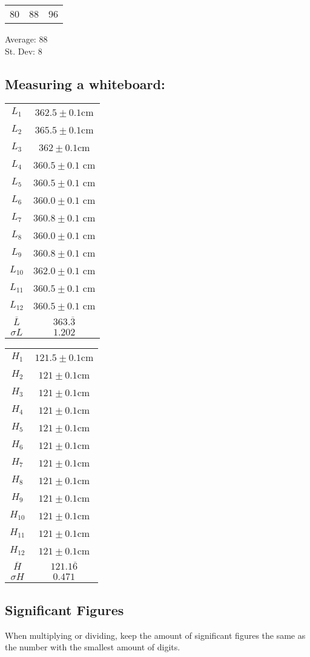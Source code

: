 \documentclass[]{article}
\begin{document}
\begin{tabular}{|c|c|c|}
    80&88&96
\end{tabular}
Average: 88\\ 
St. Dev: 8


\subsection*{Measuring a whiteboard:}
\begin{tabular}{|c|c|}
    \hline
    $L_1$&$362.5 \pm 0.1$cm\\
    $L_2$&$365.5 \pm 0.1$cm\\
    $L_3$&$362 \pm 0.1$cm\\
    $L_4$&$360.5\pm 0.1$ cm\\
    $L_5$&$360.5\pm 0.1$ cm\\
    $L_6$&$360.0\pm 0.1$ cm\\
    $L_7$&$360.8\pm 0.1$ cm\\
    $L_8$&$360.0\pm 0.1$ cm\\
    $L_9$&$360.8\pm 0.1$ cm\\
    $L_10$&$362.0\pm 0.1$ cm\\
    $L_11$&$360.5\pm 0.1$ cm\\
    $L_12$&$360.5\pm 0.1$ cm\\
    $\overline{L}$&$363.\overline{3}$\\
    $\sigma L$&$1.202$\\
    \hline
\end{tabular}
\begin{tabular}{|c|c|}
    \hline
    $H_1$&$121.5 \pm 0.1$cm\\
    $H_2$&$121 \pm 0.1$cm\\
    $H_3$&$121 \pm 0.1$cm\\
    $H_4$&$121 \pm 0.1$cm\\
    $H_5$&$121 \pm 0.1$cm\\
    $H_6$&$121 \pm 0.1$cm\\
    $H_7$&$121 \pm 0.1$cm\\
    $H_8$&$121 \pm 0.1$cm\\
    $H_9$&$121 \pm 0.1$cm\\
    $H_10$&$121 \pm 0.1$cm\\
    $H_11$&$121 \pm 0.1$cm\\
    $H_12$&$121 \pm 0.1$cm\\
    $\overline{H}$&$121.1\overline{6}$\\
    $\sigma H$&$0.471$\\
    \hline
\end{tabular}

\subsection*{Significant Figures}
When multiplying or dividing, keep the amount of significant figures the same as the number with the smallest amount of digits.
\end{document}
